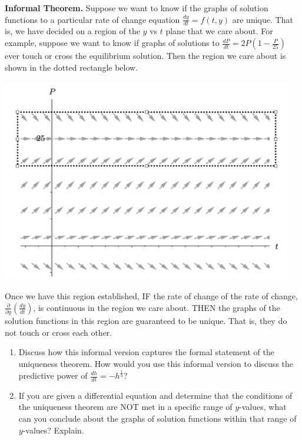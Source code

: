 \newpage

\textbf{Informal Theorem.} Suppose we want to know if the graphs of solution functions to a particular rate of change equation $\displaystyle\frac{dy}{dt}=f(t,y)$ are unique. That is, we have decided on a region of the $y$ vs $t$ plane that we care about. For example, suppose we want to know if graphs of solutions to $\displaystyle\frac{dP}{dt}=2P\left(1-\frac{P}{25}\right)$ ever touch or cross the equilibrium solution. Then the region we care about is shown in the dotted rectangle below.

\begin{center}\includegraphics[width=5in]{05/05Dotted.png} \end{center}

Once we have this region established, IF the rate of change of the rate of change, $\displaystyle\frac{\partial}{\partial y}\left(\frac{dy}{dt}\right)$, is continuous in the region we care about. THEN the graphs of the solution functions in this region are guaranteed to be unique. That is, they do not touch or cross each other.

\begin{enumerate}[resume]
\item Discuss how this informal version captures the formal statement of the uniqueness theorem. How would you use this informal version to discuss the predictive power of $\displaystyle\frac{dh}{dt}=-h^{\frac{1}{3}}$? \label{05problem6}
\vfill

\item	If you are given a differential equation and determine that the conditions of the uniqueness theorem are NOT met in a specific range of $y$-values, what can you conclude about the graphs of solution functions within that range of $y$-values? Explain. \label{05problem7}
\vfill
\end{enumerate}


